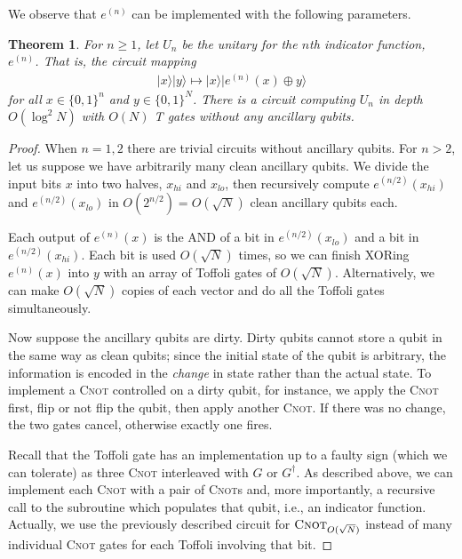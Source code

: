 \documentclass[a4paper,onecolumn,10pt,accepted=2024-05-22]{quantumarticle}
\newcommand{\ket}[1]{| #1\rangle}        %
\newtheorem{theorem}{Theorem}
\begin{document}
	We observe that $e^{(n)}$ can be implemented with the following parameters.
	\begin{theorem}
		\label{thm:indicator}
		For $n \geq 1$, let $U_n$ be the unitary for the $n$th indicator function, $e^{(n)}$. That is, the circuit mapping  
		\begin{align}
		\ket{x} \ket{y} \mapsto \ket{x} \ket{e^{(n)}(x) \oplus y}
		\end{align}
		for all $x \in \{ 0, 1 \}^{n}$ and $y \in \{ 0, 1 \}^{N}$. There is a circuit computing $U_n$ in depth $O(\log^2 N)$ with $O(N)$ \textsc{T} gates without \emph{any} ancillary qubits. 
	\end{theorem}
	\begin{proof}
		When $n = 1, 2$ there are trivial circuits without ancillary qubits. For $n > 2$, let us suppose we have arbitrarily many clean ancillary qubits. We divide the input bits $x$ into two halves, $x_{hi}$ and $x_{lo}$, then recursively compute $e^{(n/2)}(x_{hi})$ and $e^{(n/2)}(x_{lo})$ in $O(2^{n/2}) = O(\sqrt{N})$ clean ancillary qubits each.
		
		Each output of $e^{(n)}(x)$ is the AND of a bit in $e^{(n/2)}(x_{lo})$ and a bit in $e^{(n/2)}(x_{hi})$. Each bit is used $O(\sqrt{N})$ times, so we can finish XORing $e^{(n)}(x)$ into $y$ with an array of Toffoli gates of $O(\sqrt{N})$. Alternatively, we can make $O(\sqrt{N})$ copies of each vector and do all the Toffoli gates simultaneously.
		
		Now suppose the ancillary qubits are dirty. Dirty qubits cannot store a qubit in the same way as clean qubits; since the initial state of the qubit is arbitrary, the information is encoded in the \emph{change} in state rather than the actual state. To implement a \textsc{Cnot} controlled on a dirty qubit, for instance, we apply the \textsc{Cnot} first, flip or not flip the qubit, then apply another \textsc{Cnot}. If there was no change, the two gates cancel, otherwise exactly one fires.
		
		Recall that the Toffoli gate has an implementation up to a faulty sign (which we can tolerate) as three \textsc{Cnot} interleaved with $G$ or $G^{\dag}$. As described above, we can implement each \textsc{Cnot} with a pair of \textsc{Cnot}s and, more importantly, a recursive call to the subroutine which populates that qubit, i.e., an indicator function. Actually, we use the previously described circuit for  $\textsc{Cnot}_{O(\sqrt{N})}$ instead of many individual \textsc{Cnot} gates for each Toffoli involving that bit.
		

\end{proof}
\end{document}
